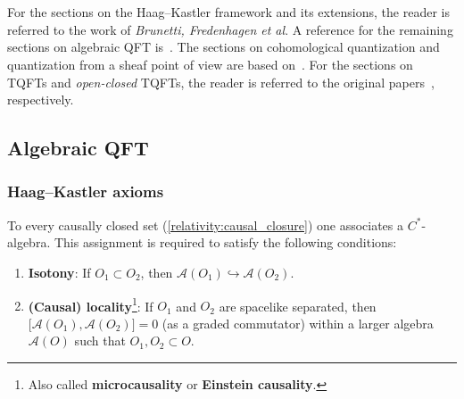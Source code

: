 \chapter{}

    For the sections on the Haag--Kastler framework and its extensions, the reader is referred to the work of \textit{Brunetti, Fredenhagen et al}. A reference for the remaining sections on algebraic QFT is~\citet{baez_introduction_2014}. The sections on cohomological quantization and quantization from a sheaf point of view are based on~\citet{nuiten_cohomological_2013}. For the sections on TQFTs and \textit{open-closed} TQFTs, the reader is referred to the original papers~\citet{atiyah_topological_1988,lauda_openclosed_2008}, respectively.

\section{Algebraic QFT}
\subsection{Haag--Kastler axioms}\label{section:haag_kastler}

    \begin{axiom}\label{aqft:microcausality}
        To every causally closed set (\cref{relativity:causal_closure}) one associates a $C^*$-algebra. This assignment is required to satisfy the following conditions:
        \begin{enumerate}
            \item\textbf{Isotony}: If $O_1\subset O_2$, then $\mathcal{A}(O_1)\hookrightarrow\mathcal{A}(O_2)$.
            \item\textbf{(Causal) locality}\footnote{Also called \textbf{microcausality} or \textbf{Einstein causality}.}: If $O_1$ and $O_2$ are spacelike separated, then $\bigl[\mathcal{A}(O_1),\mathcal{A}(O_2)\bigr]=0$ (as a graded commutator) within a larger algebra $\mathcal{A}(O)$ such that $O_1,O_2\subset O$.
        \end{enumerate}
    \end{axiom}

